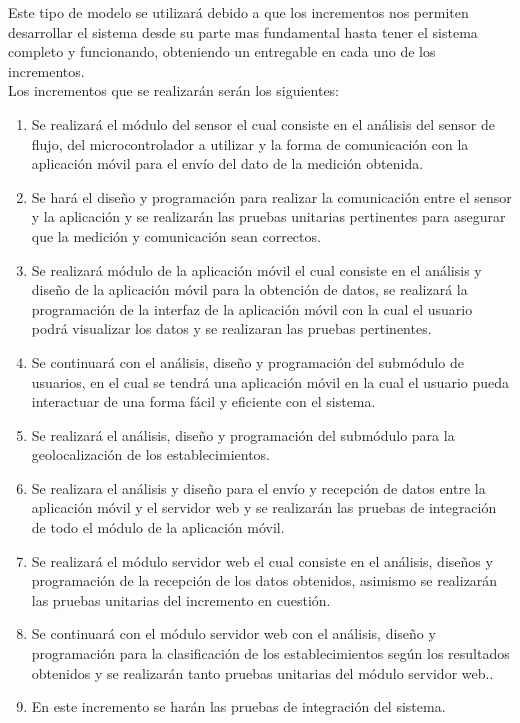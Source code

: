 Este tipo de modelo se utilizará debido a que los incrementos nos permiten desarrollar el sistema desde su parte mas fundamental hasta tener el sistema completo y funcionando, obteniendo un entregable en cada uno de los incrementos.
\\
Los incrementos que se realizarán serán los siguientes:
\\
\begin{enumerate}
	\item Se realizará el módulo del sensor el cual consiste en el análisis del sensor de flujo, del microcontrolador a utilizar y la forma de comunicación con la aplicación móvil para el envío del dato de la medición obtenida.
	\item Se hará el diseño y programación para realizar la comunicación entre el sensor y la aplicación y se realizarán las pruebas unitarias pertinentes para asegurar que la medición y comunicación sean correctos.
	\item Se realizará módulo de la aplicación móvil el cual consiste en el análisis y diseño de la aplicación móvil para la obtención de datos, se realizará la programación de la interfaz de la aplicación móvil con la cual el usuario podrá visualizar los datos y se realizaran las pruebas pertinentes.
	\item Se continuará con el análisis, diseño y programación del submódulo de usuarios, en el cual se tendrá una aplicación móvil en la cual el usuario pueda interactuar de una forma fácil y eficiente con el sistema.
	\item Se realizará el análisis, diseño y programación del submódulo para la geolocalización de los establecimientos.
	\item Se realizara el análisis y diseño para el envío y recepción de datos entre la aplicación móvil y el servidor web y se realizarán las pruebas de integración de todo el módulo de la aplicación móvil.
	\item Se realizará el módulo servidor web el cual consiste en el análisis, diseños y programación de la recepción de los datos obtenidos, asimismo se realizarán las pruebas unitarias del incremento en cuestión.
	\item Se continuará con el módulo servidor web con el análisis, diseño y programación para la clasificación de los establecimientos según los resultados obtenidos y se realizarán tanto pruebas unitarias del módulo servidor web..
	\item En este incremento se harán las pruebas de integración del sistema.	
\end{enumerate}
